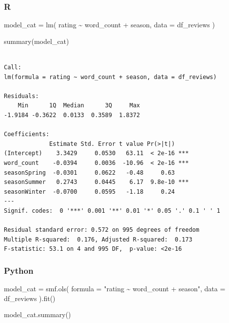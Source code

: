 \documentclass[
  letterpaper,
]{krantz}
\newenvironment{Shaded}{}{}
\newcommand{\AttributeTok}[1]{\textcolor[rgb]{0.49,0.56,0.16}{#1}}
\newcommand{\FunctionTok}[1]{\textcolor[rgb]{0.02,0.16,0.49}{#1}}
\newcommand{\NormalTok}[1]{#1}
\newcommand{\OperatorTok}[1]{\textcolor[rgb]{0.40,0.40,0.40}{#1}}
\newcommand{\OtherTok}[1]{\textcolor[rgb]{0.00,0.44,0.13}{#1}}
\newcommand{\SpecialCharTok}[1]{\textcolor[rgb]{0.25,0.44,0.63}{#1}}
\newcommand{\StringTok}[1]{\textcolor[rgb]{0.25,0.44,0.63}{#1}}
\begin{document}
\subsubsection{R}

\begin{Shaded}
\begin{Highlighting}[]
\NormalTok{model\_cat }\OtherTok{=} \FunctionTok{lm}\NormalTok{(}
\NormalTok{    rating }\SpecialCharTok{\textasciitilde{}}\NormalTok{ word\_count }\SpecialCharTok{+}\NormalTok{ season,}
    \AttributeTok{data =}\NormalTok{ df\_reviews}
\NormalTok{)}

\FunctionTok{summary}\NormalTok{(model\_cat)}
\end{Highlighting}
\end{Shaded}

\begin{verbatim}

Call:
lm(formula = rating ~ word_count + season, data = df_reviews)

Residuals:
    Min      1Q  Median      3Q     Max 
-1.9184 -0.3622  0.0133  0.3589  1.8372 

Coefficients:
             Estimate Std. Error t value Pr(>|t|)    
(Intercept)    3.3429     0.0530   63.11  < 2e-16 ***
word_count    -0.0394     0.0036  -10.96  < 2e-16 ***
seasonSpring  -0.0301     0.0622   -0.48     0.63    
seasonSummer   0.2743     0.0445    6.17  9.8e-10 ***
seasonWinter  -0.0700     0.0595   -1.18     0.24    
---
Signif. codes:  0 '***' 0.001 '**' 0.01 '*' 0.05 '.' 0.1 ' ' 1

Residual standard error: 0.572 on 995 degrees of freedom
Multiple R-squared:  0.176, Adjusted R-squared:  0.173 
F-statistic: 53.1 on 4 and 995 DF,  p-value: <2e-16
\end{verbatim}

\subsubsection{Python}

\begin{Shaded}
\begin{Highlighting}[]
\NormalTok{model\_cat }\OperatorTok{=}\NormalTok{ smf.ols(}
\NormalTok{    formula }\OperatorTok{=} \StringTok{"rating \textasciitilde{} word\_count + season"}\NormalTok{,}
\NormalTok{    data }\OperatorTok{=}\NormalTok{ df\_reviews}
\NormalTok{).fit()}

\NormalTok{model\_cat.summary()}
\end{Highlighting}
\end{Shaded}
\end{document}
